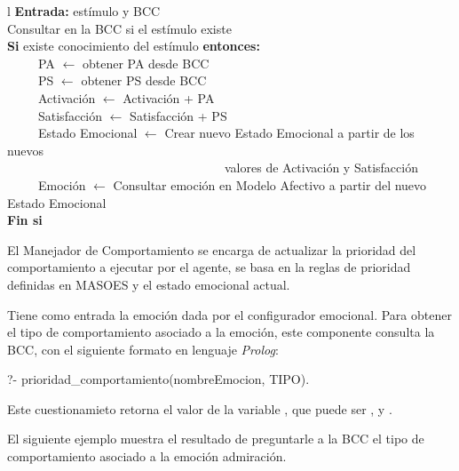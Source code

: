 \begin{cuadro}[etiqueta=algoritmo-configurador-emocional, titulo={Algoritmo del Configurador Emocional Para la Actualización del Estado Emocional del Agente}]{l}
\toprule
\textbf{Entrada:} estímulo y BCC \\
\midrule
Consultar en la BCC si el estímulo existe \\
\textbf{Si} existe conocimiento del estímulo \textbf{entonces:} \\
~~~~~PA  $\leftarrow$ obtener PA desde BCC \\
~~~~~PS  $\leftarrow$ obtener PS desde BCC \\
~~~~~Activación $\leftarrow$ Activación + PA \\
~~~~~Satisfacción $\leftarrow$ Satisfacción + PS \\
~~~~~Estado Emocional $\leftarrow$ Crear nuevo Estado Emocional a partir de los nuevos \\
~~~~~~~~~~~~~~~~~~~~~~~~~~~~~~~~~~~valores de Activación y Satisfacción \\
~~~~~Emoción $\leftarrow$ Consultar emoción en Modelo Afectivo a partir del nuevo Estado Emocional \\
\textbf{Fin si} \\
\bottomrule
{}
\end{cuadro}


El Manejador de Comportamiento se encarga de actualizar la prioridad del comportamiento a ejecutar
por el agente, se basa en la reglas de prioridad definidas en MASOES 
y el estado emocional actual.

Tiene como entrada la emoción dada por el configurador emocional.
Para obtener el tipo de comportamiento asociado a la emoción,
este componente consulta la BCC, con el siguiente formato en lenguaje \textit{Prolog}:

{
\ttfamily \fontsize{10pt}{10pt}\selectfont
\noindent ?- prioridad\_comportamiento(nombreEmocion, TIPO).
}

Este cuestionamieto retorna el valor de la variable ,
que puede ser ,
 y .

El siguiente ejemplo  muestra el
resultado de preguntarle a la BCC el tipo de comportamiento asociado a la emoción
admiración.

